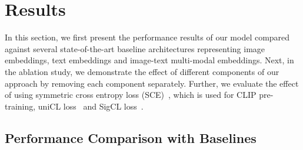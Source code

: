 \section{Results}
\label{sec:results}

In this section, we first present the performance results of our model compared against several state-of-the-art baseline architectures representing image embeddings, text embeddings and image-text multi-modal embeddings.
Next, in the ablation study, we demonstrate the effect of different components of our approach by removing each component separately. Further, we evaluate the effect of using symmetric cross entropy loss (SCE)~\cite{clip}, which is used for CLIP pre-training, uniCL loss~\cite{yang2022unified} and SigCL loss~\cite{zhai2023sigmoid}. 


\subsection{Performance Comparison with Baselines}



